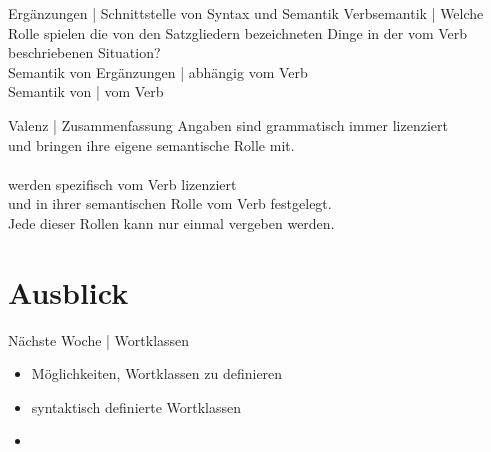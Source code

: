 \begin{frame}
  {Ergänzungen | Schnittstelle von Syntax und Semantik}
  \onslide<+->
  \onslide<+->
  Verbsemantik | Welche \alert{Rolle} spielen die von den Satzgliedern bezeichneten Dinge in der vom Verb beschriebenen Situation?\\
  \Zeile
  \onslide<+->
  Semantik von \alert{Ergänzungen} | \alert{abhängig} vom Verb\\
  \onslide<+->
  \Viertelzeile
  Semantik von  |  vom Verb\\
  \Halbzeile
  \pause
  \begin{exe}
    \ex\label{ex:valenz071}
    \begin{xlist}
      \pause
      \pause
    \end{xlist}
  \end{exe}
\end{frame}

\begin{frame}
  {Valenz | Zusammenfassung}
  \onslide<+->
  \onslide<+->
  \alert{Angaben} sind grammatisch immer lizenziert\\
  und bringen ihre eigene semantische Rolle mit.\\
  \\
  \Zeile
  \onslide<+->
  \Zeile
  \onslide<+->
   werden spezifisch vom Verb lizenziert\\
  und in ihrer semantischen Rolle vom Verb festgelegt.\\
  Jede dieser Rollen kann nur einmal vergeben werden.
\end{frame}

\section{Ausblick}

\begin{frame}
  {Nächste Woche | Wortklassen}
  \begin{itemize}[<+->]
    \item Möglichkeiten, Wortklassen zu definieren
      \Halbzeile
    \item syntaktisch definierte Wortklassen
      \Halbzeile
    \item \citet[Kapitel~6]{Schaefer2018b}
  \end{itemize}
\end{frame}
